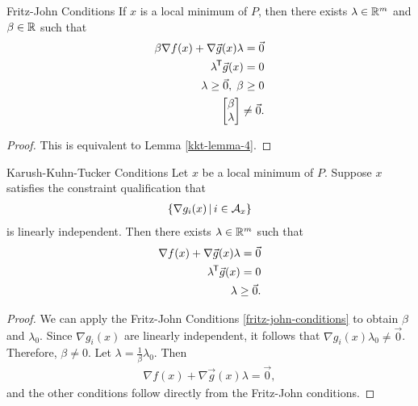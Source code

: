 \begin{thm}{Fritz-John Conditions}\label{fritz-john-conditions}\proofbreak
    If $x$ is a local minimum of $P$, then there exists $\lambda \in \mathbb{R}^m$ and $\beta \in \mathbb{R}$ such that
    \begin{align*}
        \beta\nabla f(x) + \nabla \vec{g}(x)\lambda = \vec{0} \\
        \lambda^{\mkern-1.5mu\mathsf{T}}\vec{g}(x) = 0 \\
        \lambda \geq \vec{0},\;\beta \geq 0 \\
        \begin{bmatrix}
            \beta \\ \lambda
        \end{bmatrix} \neq \vec{0}.
    \end{align*}
\end{thm}

\begin{proof}
    This is equivalent to Lemma \ref{kkt-lemma-4}.
\end{proof}

\begin{thm}{Karush-Kuhn-Tucker Conditions}\label{kkt-conditions}\proofbreak
    Let $x$ be a local minimum of $P$. Suppose $x$ satisfies the constraint qualification that
    \begin{align}
        \left\{\nabla g_i(x) \,\middle|\, i \in \mathcal{A}_x\right\}
    \end{align}
    is linearly independent. Then there exists $\lambda \in \mathbb{R}^m$ such that
    \begin{align*}
        \nabla f(x) + \nabla \vec{g}(x)\lambda = \vec{0} \\
        \lambda^{\mkern-1.5mu\mathsf{T}}\vec{g}(x) = 0 \\
        \lambda \geq \vec{0}.
    \end{align*}
\end{thm}

\begin{proof}
    We can apply the Fritz-John Conditions \ref{fritz-john-conditions} to obtain $\beta$ and $\lambda_0$. Since $\nabla g_i(x)$ are linearly independent, it follows that $\nabla g_i(x)\lambda_0 \neq \vec{0}$. Therefore, $\beta \neq 0$. Let $\lambda = \frac{1}{\beta}\lambda_0$. Then
    \begin{align*}
        \nabla f(x) + \nabla \vec{g}(x)\lambda = \vec{0},
    \end{align*}
    and the other conditions follow directly from the Fritz-John conditions.
\end{proof}
